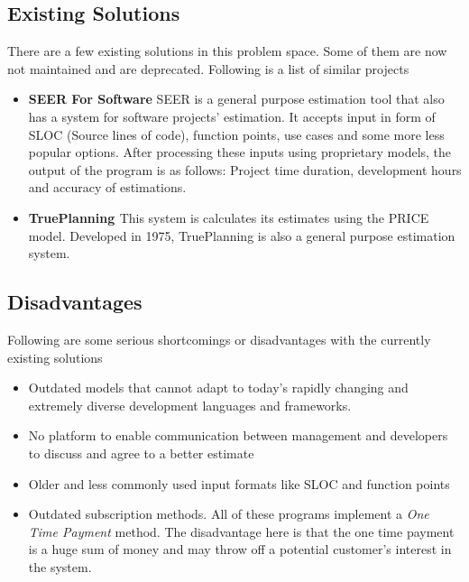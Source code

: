 \subsection{Existing Solutions}
There are a few existing solutions in this problem space. Some of them are now not maintained and are deprecated. Following is a list of similar projects
\begin{itemize}
	\item {\bf{SEER For Software}}\newline
	SEER is a general purpose estimation tool that also has a system for software projects' estimation. It accepts input in form of SLOC (Source lines of code), function points, use cases and some more less popular options. After processing these inputs using proprietary models, the output of the program is as follows: Project time duration, development hours and accuracy of estimations.

	\item {\bf{TruePlanning \small{\textregistered}}}\newline
	This system is calculates its estimates using the PRICE model. Developed in 1975, TruePlanning is also a general purpose estimation system.
	
\end{itemize}













\subsection{Disadvantages}
Following are some serious shortcomings or disadvantages with the currently existing solutions
\begin{itemize}
	\item Outdated models that cannot adapt to today's rapidly changing and extremely diverse development languages and frameworks.
	\item No platform to enable communication between management and developers to discuss and agree to a better estimate
	\item Older and less commonly used input formats like SLOC and function points
	\item Outdated subscription methods. All of these programs implement a {\it{One Time Payment}} method. The disadvantage here is that the one time payment is a huge sum of money and may throw off a potential customer's interest in the system.
\end{itemize}









